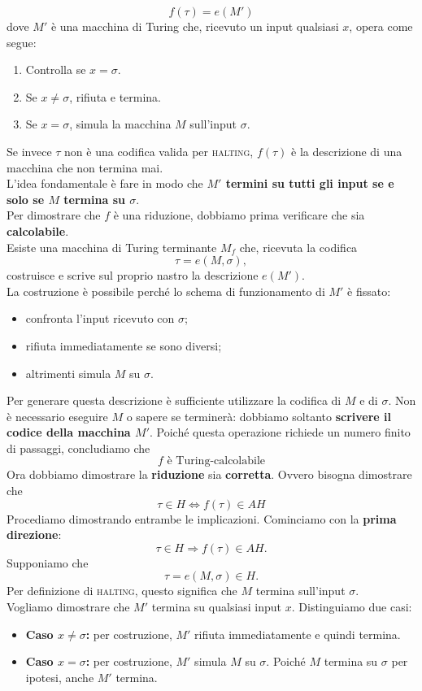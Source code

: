 \[
\boxed{f(\tau)=e(M')}
\]
dove $M'$ è una macchina di Turing che, ricevuto un input qualsiasi $x$, opera come segue:
\begin{enumerate}
    \item Controlla se $x=\sigma$.

    \item Se $x\neq\sigma$, rifiuta e termina.

    \item Se $x=\sigma$, simula la macchina
    $M$ sull'input $\sigma$.
\end{enumerate}
Se invece $\tau$ non è una codifica valida
per \textsc{halting}, $f(\tau)$ è la descrizione
di una macchina che non termina mai.\\
L'idea fondamentale è fare in modo che
\textbf{$M'$ termini su tutti gli input
se e solo se $M$ termina su $\sigma$}.\smallskip\\
Per dimostrare che $f$ è una riduzione,
dobbiamo prima verificare che sia \textbf{calcolabile}.\\
Esiste una macchina di Turing terminante $M_f$
che, ricevuta la codifica
\[
\tau=e(M,\sigma),
\]
costruisce e scrive sul proprio nastro
la descrizione $e(M')$.\\
La costruzione è possibile perché lo schema
di funzionamento di $M'$ è fissato:
\begin{itemize}
    \item confronta l'input ricevuto con $\sigma$;
    \item rifiuta immediatamente se sono diversi;
    \item altrimenti simula $M$ su $\sigma$.
\end{itemize}
Per generare questa descrizione è sufficiente
utilizzare la codifica di $M$ e di $\sigma$.
Non è necessario eseguire $M$ o sapere
se terminerà: dobbiamo soltanto
\textbf{scrivere il codice della macchina $M'$}.
Poiché questa operazione richiede
un numero finito di passaggi, concludiamo che
\[
\boxed{f\text{ è Turing-calcolabile}}
\]
Ora dobbiamo dimostrare la \textbf{riduzione} sia \textbf{corretta}. Ovvero bisogna dimostrare che
\[
\tau\in H\iff f(\tau)\in AH
\]
Procediamo dimostrando entrambe le implicazioni. Cominciamo con la \textbf{prima direzione}:
\[
\tau\in H\Rightarrow f(\tau)\in AH.
\]
Supponiamo che
\[
\tau=e(M,\sigma)\in H.
\]
Per definizione di \textsc{halting}, questo significa
che $M$ termina sull'input $\sigma$.\\
Vogliamo dimostrare che $M'$ termina
su qualsiasi input $x$. Distinguiamo due casi:
\begin{itemize}
    \item \textbf{Caso $x\neq\sigma$:}
    per costruzione, $M'$ rifiuta immediatamente
    e quindi termina.

    \item \textbf{Caso $x=\sigma$:}
    per costruzione, $M'$ simula $M$ su $\sigma$.
    Poiché $M$ termina su $\sigma$ per ipotesi,
    anche $M'$ termina.
\end{itemize}
